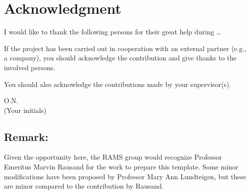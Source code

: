 \section*{Acknowledgment}
I would like to thank the following persons for their great help during \ldots

If the project has been carried out in cooperation with an external partner (e.g., a company), you should acknowledge the contribution and give thanks to the involved persons.

You should also acknowledge the contributions made by your supervisor(s). 


\begin{flushright}
O.N.\\[1pc]
(Your initials)
\end{flushright}

\subsection*{Remark:}
Given the opportunity here, the RAMS group would recognize Professor Emeritus Marvin Rausand for the work to prepare this template. Some minor modifications have been proposed by Professor Mary Ann Lundteigen, but these are minor compared to the contribution by Rausand.



